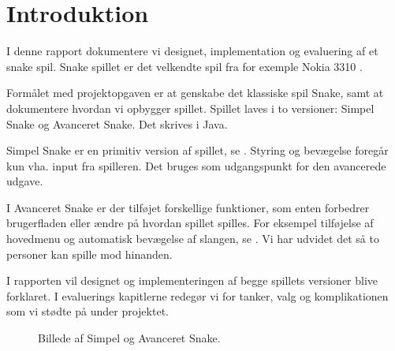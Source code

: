 \chapter{Introduktion}
I denne rapport dokumentere vi designet, implementation og evaluering af et snake spil. Snake spillet er det velkendte spil fra for exemple Nokia 3310 \cite{wiki_snake}. 

Formålet med projektopgaven er at genskabe det klassiske spil Snake, samt at dokumentere hvordan vi opbygger spillet. Spillet laves i to versioner: Simpel Snake og Avanceret Snake. Det skrives i Java.

Simpel Snake er en primitiv version af spillet, se . Styring og bevægelse foregår kun vha. input fra spilleren. Det bruges som udgangspunkt for den avancerede udgave.

I Avanceret Snake er der tilføjet forskellige funktioner, som enten forbedrer brugerfladen eller ændre på hvordan spillet spilles. For eksempel tilføjelse af hovedmenu og automatisk bevægelse af slangen, se . Vi har udvidet det så to personer kan spille mod hinanden.

I rapporten vil designet og implementeringen af begge spillets versioner blive forklaret. I evaluerings kapitlerne redegør vi for tanker, valg og komplikationen som vi stødte på under projektet. 

\begin{figure}
	\centering
	\hspace{0.1\textwidth}
	\caption{Billede af Simpel og Avanceret Snake.}
\end{figure}
